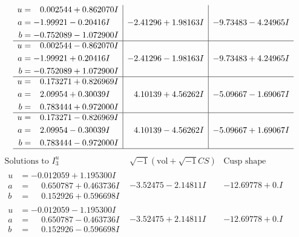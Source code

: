\documentclass[1p]{elsarticle_modified}
\theoremstyle{definition}
\newcommand{\I}{\sqrt{-1}}
\begin{document}
$$\begin{array}{c|c|c}
\begin{aligned}
u &= \phantom{-}0.002544 + 0.862070 I \\
a &= -1.99921 - 0.20416 I \\
b &= -0.752089 - 1.072900 I\end{aligned}
 & -2.41296 + 1.98163 I & -9.73483 - 4.24965 I \\ \hline\begin{aligned}
u &= \phantom{-}0.002544 - 0.862070 I \\
a &= -1.99921 + 0.20416 I \\
b &= -0.752089 + 1.072900 I\end{aligned}
 & -2.41296 - 1.98163 I & -9.73483 + 4.24965 I \\ \hline\begin{aligned}
u &= \phantom{-}0.173271 + 0.826969 I \\
a &= \phantom{-}2.09954 + 0.30039 I \\
b &= \phantom{-}0.783444 + 0.972000 I\end{aligned}
 & \phantom{-}4.10139 + 4.56262 I & -5.09667 - 1.69067 I \\ \hline\begin{aligned}
u &= \phantom{-}0.173271 - 0.826969 I \\
a &= \phantom{-}2.09954 - 0.30039 I \\
b &= \phantom{-}0.783444 - 0.972000 I\end{aligned}
 & \phantom{-}4.10139 - 4.56262 I & -5.09667 + 1.69067 I\\
 \hline 
 \end{array}$$\newpage$$\begin{array}{c|c|c}  
\text{Solutions to }I^u_{3}& \I (\text{vol} + \sqrt{-1}CS) & \text{Cusp shape}\\
 \hline 
\begin{aligned}
u &= -0.012059 + 1.195300 I \\
a &= \phantom{-}0.650787 + 0.463736 I \\
b &= \phantom{-}0.152926 + 0.596698 I\end{aligned}
 & -3.52475 - 2.14811 I & -12.69778 + 0. I\phantom{ +0.000000I} \\ \hline\begin{aligned}
u &= -0.012059 - 1.195300 I \\
a &= \phantom{-}0.650787 - 0.463736 I \\
b &= \phantom{-}0.152926 - 0.596698 I\end{aligned}
 & -3.52475 + 2.14811 I & -12.69778 + 0. I\phantom{ +0.000000I} \\ \hline\begin{aligned}

\end{aligned}
\end{array}$$
\end{document}
